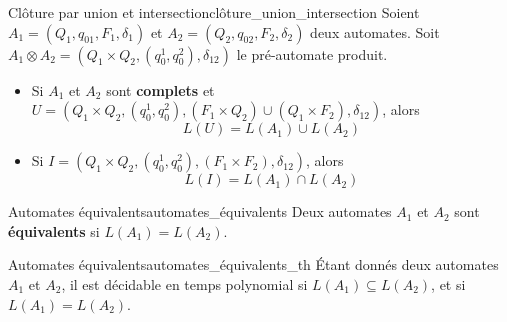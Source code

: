 \begin{theorem}{Clôture par union et intersection}{clôture_union_intersection}
    Soient $A_1 = (Q_1, q_{01}, F_1, \delta_1)$ et $A_2 = (Q_2, q_{02}, F_2, \delta_2)$ deux automates. Soit $A_1\otimes A_2 =
    (Q_1\times Q_2, (q_0^1,q_0^2),\delta_{12})$ le pré-automate produit.
    \begin{itemize}[label=\textbullet]
        \item Si $A_1$ et $A_2$ sont \textbf{complets} et \\
            $U = (Q_1\times Q_2, (q_0^1,q_0^2),(F_1\times Q_2)\cup(Q_1\times F_2),\delta_{12})$, alors
        \begin{equation*}
            L(U) = L(A_1) \cup L(A_2)
        \end{equation*}
        \item Si $I = (Q_1\times Q_2, (q_0^1,q_0^2),(F_1\times F_2),\delta_{12})$, alors
        \begin{equation*}
            L(I) = L(A_1) \cap L(A_2)
        \end{equation*}
    \end{itemize}
\end{theorem}
\begin{definition}{Automates équivalents}{automates_équivalents}
    Deux automates $A_1$ et $A_2$ sont \textbf{équivalents} si $L(A_1) = L(A_2)$.
\end{definition}
\begin{theorem}{Automates équivalents}{automates_équivalents_th}
    Étant donnés deux automates $A_1$ et $A_2$, il est décidable en temps polynomial si $L(A_1) \subseteq L(A_2)$, et si 
    $L(A_1) = L(A_2)$.
\end{theorem}
